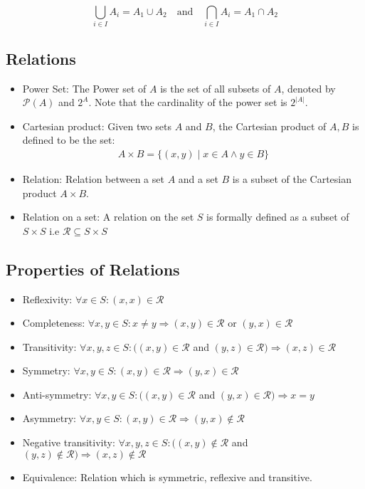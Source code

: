\documentclass[12pt,a4paper]{article}
\begin{document}
\[\bigcup_{i \in I} A_i=A_1 \cup A_2 \quad \text{and} \quad \bigcap_{i \in I} A_i=A_1 \cap A_2 \]

 \subsection{Relations} 
 \begin{itemize}
    \item Power Set: The Power set of \(A\) is the set of all subsets of \(A\), denoted by \(\mathcal{P}(A)\) and \(2^A\). Note that the cardinality of the power set is \(2^{|A|}\).
    \item Cartesian product: Given two sets \(A\) and \(B\), the Cartesian product of \(A, B\) is defined to be the set:
     \begin{align*}
    A \times B=\{(x, y) \mid x \in A \wedge y \in B\}
    \end{align*}
      \item Relation: Relation between a set \(A\) and a set \(B\) is a subset of the Cartesian product \(A \times B\).
    \item Relation on a set: A relation on the set \(S\) is formally defined as a subset of \(S \times S\) i.e \(\mathcal{R} \subseteq S \times S\)
 \end{itemize}

  \subsection{Properties of Relations} 
  \begin{itemize}
    \item  Reflexivity: \(\forall x \in S:(x, x) \in \mathcal{R}\)
    \item Completeness: \(\forall x, y \in S: x \neq y \Rightarrow(x, y) \in \mathcal{R}\) or \((y, x) \in \mathcal{R}\)
    \item Transitivity: \(\forall x, y, z \in S:((x, y) \in \mathcal{R}\) and \((y, z) \in \mathcal{R}) \Rightarrow(x, z) \in \mathcal{R}\)
    \item Symmetry: \(\forall x, y \in S:(x, y) \in \mathcal{R} \Rightarrow(y, x) \in \mathcal{R}\)
    \item Anti-symmetry: \(\forall x, y \in S:((x, y) \in \mathcal{R}\) and \((y, x) \in \mathcal{R}) \Rightarrow x=y\)
    \item Asymmetry: \(\forall x, y \in S:(x, y) \in \mathcal{R} \Rightarrow(y, x) \notin \mathcal{R}\)
    \item Negative transitivity: \(\forall x, y, z \in S:((x, y) \notin \mathcal{R}\) and \((y, z) \notin \mathcal{R}) \Rightarrow(x, z) \notin \mathcal{R}\)
    \item Equivalence: Relation which is symmetric, reflexive and transitive.
  \end{itemize}
\end{document}

